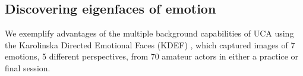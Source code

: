 \documentclass[12pt]{article}
\begin{document}
\subsection{\label{sec:faces}Discovering eigenfaces of emotion}

We exemplify advantages of the multiple background capabilities of UCA using the Karolinska Directed Emotional Faces (KDEF) \cite{Calvo2008}, which captured images of 7 emotions, 5 different perspectives, from 70 amateur actors in either a practice or final session.
\begin{figure}[ht]
\centering
\tabskip=0pt
\end{figure}
\end{document}
